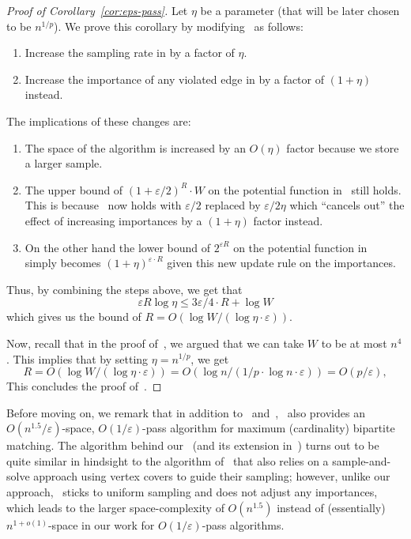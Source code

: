 \documentclass{theoretics}
\renewcommand{\leq}{\leqslant}
\newcommand{\eps}{\varepsilon}
\begin{document}
\begin{proof}[Proof of Corollary~\ref{cor:eps-pass}]
Let $\eta$ be a parameter (that will be later chosen to be $n^{1/p}$). We prove this corollary by modifying~ as follows: 
\begin{enumerate}
	\item Increase the sampling rate in  by a factor of $\eta$. 
	\item Increase the importance of any violated edge in  by a factor of $(1+\eta)$ instead. 
\end{enumerate}
The implications of these changes are: 
\begin{enumerate}
	\item The space of the algorithm is increased by an $O(\eta)$ factor because we store a larger sample. 
	\item The upper bound of $(1+\eps/2)^{R} \cdot W$ on the potential function in~ still holds. This is because~ now holds with $\eps/2$ replaced by $\eps/2\eta$ which
	``cancels out'' the effect of increasing importances by a $(1+\eta)$ factor instead. 
	
	\item On the other hand the lower bound of $2^{\eps R}$ on the potential function in~ simply becomes $(1+\eta)^{\eps \cdot R}$ 
	given this new update rule on the importances. 
\end{enumerate}
	 Thus, by combining the steps above, we get that 
	\[
		\eps R \log{\eta} \leq 3\eps/4 \cdot R + \log{W}
	\]
	which gives us the bound of $R=O(\log{W}/(\log{\eta} \cdot \eps))$. 

Now, recall that in the proof of~, we argued that we can take $W$ to be at most $n^{4}$. This implies that by setting $\eta = n^{1/p}$, we get 
\[
	R = O(\log{W}/(\log{\eta} \cdot \eps)) = O(\log{n}/(1/p \cdot \log{n} \cdot \eps)) = O(p/\eps), 
\]
This concludes the proof of~.
\end{proof}

Before moving on, we remark that in addition to~\cite{AhnG15} and~,~\cite{BehnezhadDETY17} also provides an $O(n^{1.5}/\eps)$-space, $O(1/\eps)$-pass algorithm for maximum (cardinality) bipartite matching.   
The algorithm behind our~ (and its extension in~) turns out to be quite similar in hindsight to the algorithm of~\cite{BehnezhadDETY17} that also relies on a sample-and-solve approach
using vertex covers to guide their sampling; however, unlike our approach,~\cite{BehnezhadDETY17} sticks to uniform sampling and does not adjust any importances, which leads to the larger space-complexity of $O(n^{1.5})$ instead 
of (essentially) $n^{1+o(1)}$-space in our work for $O(1/\eps)$-pass algorithms. 
\end{document}
